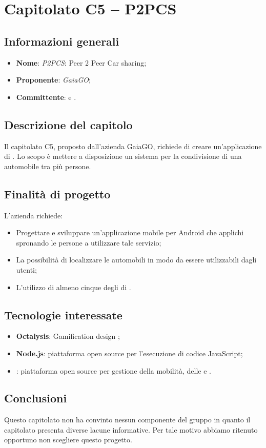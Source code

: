 \section{Capitolato C5 – P2PCS}

\subsection{Informazioni generali}
% 
\begin{itemize}
\item \textbf{Nome}: \textit{P2PCS}: Peer 2 Peer Car sharing;\phantom{.}
\item \textbf{Proponente}: \textit{GaiaGO};\phantom{.}
\item \textbf{Committente}: \commitNameM\mbox{} e \commitNameS.
\end{itemize}

\subsection{Descrizione del capitolo}
Il capitolato C5, proposto dall'azienda GaiaGO, richiede di creare un’applicazione di  . Lo scopo è mettere a disposizione un sistema per la condivisione di una automobile tra più persone.


\subsection{Finalità di progetto}
L'azienda richiede:
\begin{itemize} 
    \item Progettare e sviluppare un’applicazione mobile per Android che applichi  spronando le persone a utilizzare tale servizio;
    \item La possibilità di localizzare le automobili in modo da essere utilizzabili dagli utenti;
    \item L'utilizzo di almeno cinque degli  di .
\end{itemize}

\subsection{Tecnologie interessate}
\begin{itemize}
    \item \textbf{Octalysis}: Gamification design ;
    \item \textbf{Node.js}: piattaforma open source per l'esecuzione di codice JavaScript;
    \item \textbf{}: piattaforma open source per gestione della mobilità, delle  e .
\end{itemize}   

\subsection{Conclusioni}
Questo capitolato non ha convinto nessun componente del gruppo in quanto il capitolato presenta diverse lacune informative. Per tale motivo abbiamo ritenuto opportuno non scegliere questo progetto.